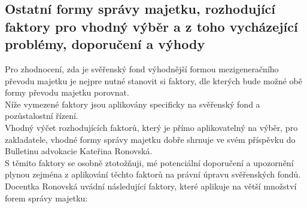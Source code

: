 \documentclass{article}
\begin{document}
\subsection{Ostatní formy správy majetku, rozhodující faktory pro vhodný výběr a z toho vycházející problémy, doporučení a výhody}



Pro zhodnocení, zda je svěřenský fond výhodnější formou mezigeneračního převodu majetku je nejpre nutné stanovit si faktory, dle kterých bude možné obě formy převodu majetku porovnat.\\

Níže vymezené faktory jsou aplikovány specificky na svěřenský fond a pozůstalostní řízení.\\

Vhodný výčet rozhodujících faktorů, který je přímo aplikovatelný na výběr, pro zakladatele, vhodné formy správy majetku dobře shrnuje ve svém příspěvku do Bulletinu advokacie Kateřina Ronovská.\\

S těmito faktory se osobně ztotožňuji, mé potenciální doporučení a upozornění plynou zejména z aplikování těchto faktorů na právní úpravu svěřenských fondů.\\

Docentka Ronovská uvádní následující faktory, které aplikuje na větší množství forem správy majetku:
\end{document}
